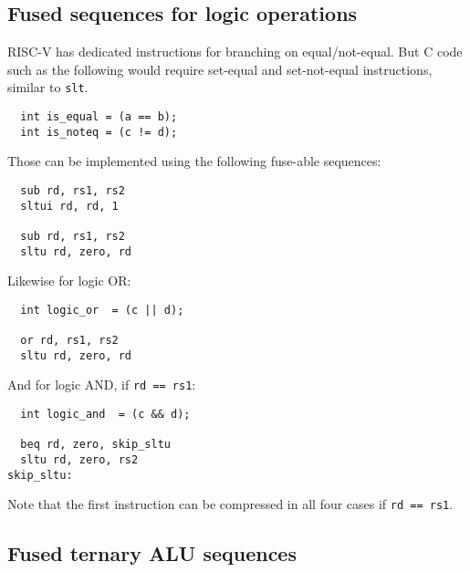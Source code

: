 \subsection{Fused sequences for logic operations}

RISC-V has dedicated instructions for branching on equal/not-equal. But C code
such as the following would require set-equal and set-not-equal instructions, similar
to {\tt slt}.

\begin{minipage}{\linewidth}
\begin{verbatim}
  int is_equal = (a == b);
  int is_noteq = (c != d);
\end{verbatim}
\end{minipage}

Those can be implemented using the following fuse-able sequences:

\begin{minipage}{\linewidth}
\begin{verbatim}
  sub rd, rs1, rs2
  sltui rd, rd, 1

  sub rd, rs1, rs2
  sltu rd, zero, rd
\end{verbatim}
\end{minipage}

Likewise for logic OR:

\begin{minipage}{\linewidth}
\begin{verbatim}
  int logic_or  = (c || d);

  or rd, rs1, rs2
  sltu rd, zero, rd
\end{verbatim}
\end{minipage}

And for logic AND, if {\tt rd == rs1}:

\begin{minipage}{\linewidth}
\begin{verbatim}
  int logic_and  = (c && d);

  beq rd, zero, skip_sltu
  sltu rd, zero, rs2
skip_sltu:
\end{verbatim}
\end{minipage}

Note that the first instruction can be compressed in all four cases if {\tt rd == rs1}.


\subsection{Fused ternary ALU sequences}

